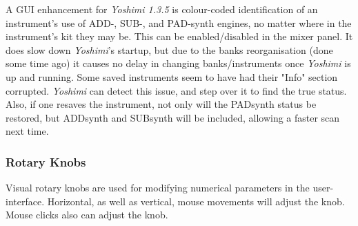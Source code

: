    A GUI enhancement for \textsl{Yoshimi 1.3.5} is colour-coded identification
   of an instrument's use of ADD-, SUB-, and PAD-synth engines, no matter where
   in the instrument's kit they may be. This can be enabled/disabled in the
   mixer panel. It does slow down \textsl{Yoshimi}'s startup, but due to the
   banks reorganisation (done some time ago) it causes no delay in changing
   banks/instruments once \textsl{Yoshimi} is up and running.  Some saved
   instruments seem to have had their "Info" section corrupted.
   \textsl{Yoshimi} can detect this issue, and step over it to find the true
   status. Also, if one resaves the instrument, not only will the PADsynth
   status be restored, but ADDsynth and SUBsynth will be included, allowing a
   faster scan next time.

\subsubsection{Rotary Knobs}
\label{subsubsec:stock_settings_elements_knobs}

   Visual rotary knobs are used for modifying numerical parameters in the
   user-interface.
   Horizontal, as well as vertical, mouse movements will adjust the knob.
   Mouse clicks also can adjust the knob.


